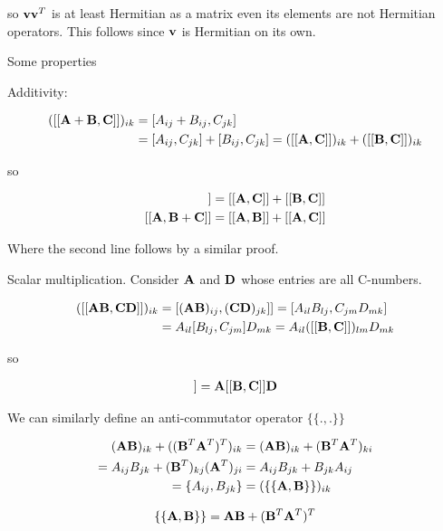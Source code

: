 \documentclass[12pt]{article}
\newcommand{\bv}[1]{\bold{#1}}
\begin{document}
so $\bv{v}\bv{v}^T$ is at least Hermitian as a matrix even its elements are not Hermitian operators. This follows since $\bv{v}$ is Hermitian on its own.

Some properties

Additivity:

\begin{align}
([[\bv{A}+\bv{B},\bv{C}]])_{ik} &= [A_{ij}+B_{ij},C_{jk}]\\
&= [A_{ij},C_{jk}]+[B_{ij},C_{jk}] = ([[\bv{A},\bv{C}]])_{ik} + ([[\bv{B},\bv{C}]])_{ik}
\end{align}

so

\begin{align}
[[\bv{A}+\bv{B},\bv{C}]] &= [[\bv{A},\bv{C}]]+[[\bv{B},\bv{C}]]\\
[[\bv{A},\bv{B}+\bv{C}]] &= [[\bv{A},\bv{B}]] + [[\bv{A},\bv{C}]]
\end{align}

Where the second line follows by a similar proof.

Scalar multiplication. Consider $\bv{A}$ and $\bv{D}$ whose entries are all C-numbers.

\begin{align}
([[\bv{A}\bv{B},\bv{C}\bv{D}]])_{ik} &= [(\bv{A}\bv{B})_{ij},(\bv{C}\bv{D})_{jk}]] = [A_{il}B_{lj},C_{jm}D_{mk}]\\
&= A_{il}[B_{lj},C_{jm}]D_{mk}= A_{il}([[\bv{B},\bv{C}]])_{lm} D_{mk}
\end{align}

so

\begin{align}
[[\bv{A}\bv{B},\bv{C}\bv{D}]] = \bv{A}[[\bv{B},\bv{C}]]\bv{D}
\end{align}

We can similarly define an anti-commutator operator $\{\{.,.\}\}$

\begin{align}
(\bv{A}\bv{B})_{ik} + ((\bv{B}^T\bv{A}^T)^T)_{ik} &= (\bv{A}\bv{B})_{ik} + (\bv{B}^T\bv{A}^T)_{ki}\\
= A_{ij} B_{jk} + (\bv{B}^T)_{kj}(\bv{A}^T)_{ji} &= A_{ij}B_{jk} + B_{jk} A_{ij}\\
= \{A_{ij},B_{jk}\} &= (\{\{\bv{A},\bv{B}\}\})_{ik}
\end{align}

\begin{align}
\{\{\bv{A},\bv{B}\}\} = \bv{A}\bv{B} + (\bv{B}^T\bv{A}^T)^T
\end{align}
\end{document}
